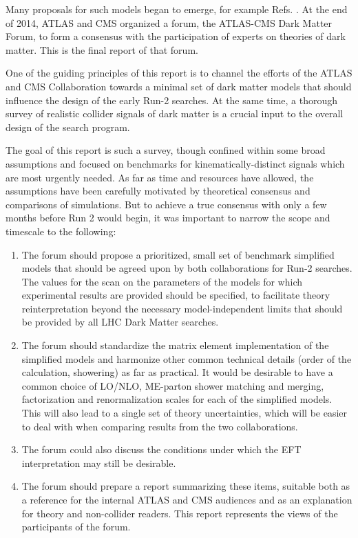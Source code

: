 Many proposals for such models began to emerge, for example
Refs. \cite{An:2012va,An:2012ue,Tait:2013,Buchmueller:2013dya,Bai:2013iqa,Bai:2014osa,An:201489115014,Yavin:14092893,Malik:2014ggr,Harris:2014hga,Buckley:2014fba,Haisch:2015ioa}. At
the end of 2014, ATLAS and CMS organized a forum, the ATLAS-CMS Dark
Matter Forum, to form a consensus with the participation of experts on
theories of dark matter. This is the final report of that forum.

One of the guiding principles of this report is to channel the efforts
of the ATLAS and CMS Collaboration towards a minimal set of dark
matter models that should influence the design of the early Run-2
searches. At the same time, a thorough survey of realistic collider
signals of dark matter is a crucial input to the overall design of the
search program.

The goal of this report is such a survey, though confined within some
broad assumptions and focused on benchmarks for kinematically-distinct
signals which are most urgently needed. As far as time and resources
have allowed, the assumptions have been carefully motivated by
theoretical consensus and comparisons of simulations. But to achieve a
true consensus with only a few months before Run 2 would begin, it was
important to narrow the scope and timescale to the following:

\begin{enumerate}
\item The forum should propose a prioritized, small set of benchmark
  simplified models that should be agreed upon by both collaborations for
  Run-2 searches. The values for the scan on the parameters of the models for which
  experimental results are provided should be specified, to facilitate theory reinterpretation 
  beyond the necessary model-independent limits that 
  should be provided by all LHC Dark Matter searches. 
\item The forum should standardize the matrix element implementation
  of the simplified models and harmonize other common technical
  details (order of the calculation, showering) as far as practical. It
  would be desirable to have a common choice of LO/NLO, ME-parton
  shower matching and merging, factorization and renormalization
  scales for each of the simplified models. This will also lead to a
  single set of theory uncertainties, which will be easier to deal
  with when comparing results from the two collaborations.
\item The forum could also discuss the conditions under which the EFT
  interpretation may still be desirable.
\item The forum should prepare a report summarizing these items,
  suitable both as a reference for the internal ATLAS and CMS
  audiences and as an explanation for theory and non-collider
  readers. This report represents the views of the participants of the
  forum.
\end{enumerate}


